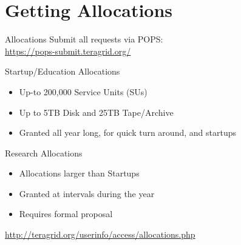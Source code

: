 \documentclass[handout]{beamer}
\begin{document}
  \section{Getting Allocations}
  \begin{frame}{Allocations}
    Submit all requests via POPS: \\
    \url{https://pops-submit.teragrid.org/}
   \begin{block}{Startup/Education Allocations}
    \begin{itemize}
     \item Up-to 200,000 Service Units (SUs)
     \item Up to 5TB Disk and 25TB Tape/Archive
     \item Granted all year long, for quick turn around, and startups
    \end{itemize}
   \end{block}
   \begin{block}{Research Allocations}
    \begin{itemize}
     \item Allocations larger than Startups
     \item Granted at intervals during the year
     \item Requires formal proposal
    \end{itemize}
     \url{http://teragrid.org/userinfo/access/allocations.php}
   \end{block}
  \end{frame}
\end{document}
